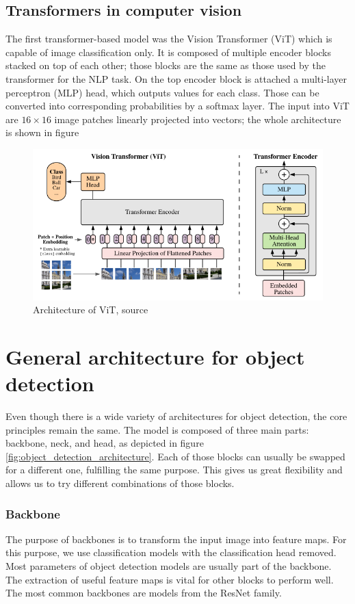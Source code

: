 \subsection{Transformers in computer vision}
The first transformer-based model was the Vision Transformer (ViT) which is capable of image classification only. It is composed of multiple encoder blocks stacked on top of each other; those blocks are the same as those used by the transformer for the NLP task. On the top encoder block is attached a multi-layer perceptron (MLP) head, which outputs values for each class. Those can be converted into corresponding probabilities by a softmax layer. The input into ViT are $16 \times 16$ image patches linearly projected into vectors; the whole architecture is shown in figure
\begin{figure}
    \centering
    \includegraphics[width=\linewidth]{images/vision_transformer.png}
    \caption{Architecture of ViT, source \cite{Dosovitskiy2020}}
    \label{fig:vision_transformer}
\end{figure}


\section{General architecture for object detection}
Even though there is a wide variety of architectures for object detection, the core principles remain the same. The model is composed of three main parts: backbone, neck, and head, as depicted in figure \ref{fig:object_detection_architecture}. Each of those blocks can usually be swapped for a different one, fulfilling the same purpose. This gives us great flexibility and allows us to try different combinations of those blocks.



\subsubsection{Backbone}
The purpose of backbones is to transform the input image into feature maps. For this purpose, we use classification models with the classification head removed. Most parameters of object detection models are usually part of the backbone. The extraction of useful feature maps is vital for other blocks to perform well. The most common backbones are models from the ResNet family.

